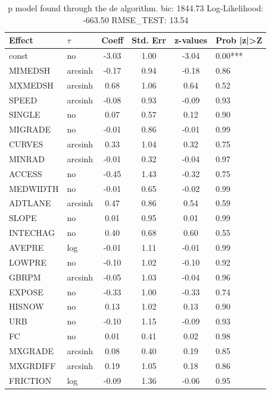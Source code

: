 \begin{table}
	\caption{p model found through the de algorithm. bic: 1844.73 Log-Likelihood: -663.50 RMSE_TEST: 13.54}
	\begin{center}
		\begin{tabular}{|l|l|c|c|c|l|}
			\hline
			Effect & $\tau$ & Coeff & Std. Err & z-values & Prob |z|>Z \\
			\hline
			const & no & -3.03 & 1.00 & -3.04 & 0.00*** \\
			\hline
			MIMEDSH & arcsinh & -0.17 & 0.94 & -0.18 & 0.86 \\
			\hline
			MXMEDSH & arcsinh & 0.68 & 1.06 & 0.64 & 0.52 \\
			\hline
			SPEED & arcsinh & -0.08 & 0.93 & -0.09 & 0.93 \\
			\hline
			SINGLE & no & 0.07 & 0.57 & 0.12 & 0.90 \\
			\hline
			MIGRADE & no & -0.01 & 0.86 & -0.01 & 0.99 \\
			\hline
			CURVES & arcsinh & 0.33 & 1.04 & 0.32 & 0.75 \\
			\hline
			MINRAD & arcsinh & -0.01 & 0.32 & -0.04 & 0.97 \\
			\hline
			ACCESS & no & -0.45 & 1.43 & -0.32 & 0.75 \\
			\hline
			MEDWIDTH & no & -0.01 & 0.65 & -0.02 & 0.99 \\
			\hline
			ADTLANE & arcsinh & 0.47 & 0.86 & 0.54 & 0.59 \\
			\hline
			SLOPE & no & 0.01 & 0.95 & 0.01 & 0.99 \\
			\hline
			INTECHAG & no & 0.40 & 0.68 & 0.60 & 0.55 \\
			\hline
			AVEPRE & log & -0.01 & 1.11 & -0.01 & 0.99 \\
			\hline
			LOWPRE & no & -0.10 & 1.02 & -0.10 & 0.92 \\
			\hline
			GBRPM & arcsinh & -0.05 & 1.03 & -0.04 & 0.96 \\
			\hline
			EXPOSE & no & -0.33 & 1.00 & -0.33 & 0.74 \\
			\hline
			HISNOW & no & 0.13 & 1.02 & 0.13 & 0.90 \\
			\hline
			URB & no & -0.10 & 1.15 & -0.09 & 0.93 \\
			\hline
			FC & no & 0.01 & 0.41 & 0.02 & 0.98 \\
			\hline
			MXGRADE & arcsinh & 0.08 & 0.40 & 0.19 & 0.85 \\
			\hline
			MXGRDIFF & arcsinh & 0.19 & 1.05 & 0.18 & 0.86 \\
			\hline
			FRICTION & log & -0.09 & 1.36 & -0.06 & 0.95 \\

\end{tabular}
\end{center}
\end{table}
